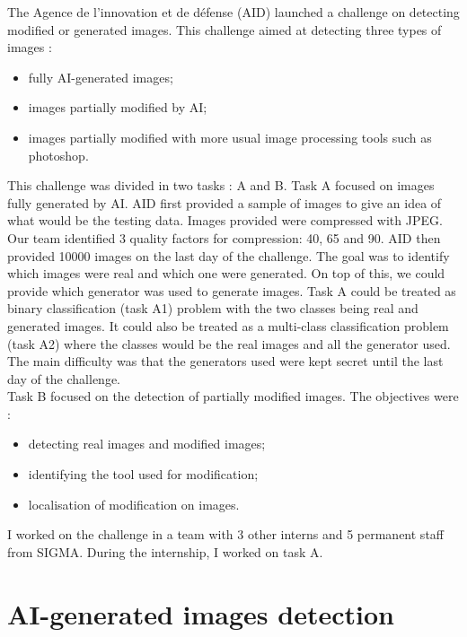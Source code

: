 \documentclass[12pt,a4paper]{article}
\begin{document}
The Agence de l'innovation et de défense (AID) launched a challenge on detecting modified or generated images. This challenge aimed at detecting three types of images :
\begin{itemize}
    \item fully AI-generated images;
    \item images partially modified by AI;
    \item images partially modified with more usual image processing tools such as photoshop.
\end{itemize}
This challenge was divided in two tasks : A and B. Task A focused on images fully generated by AI. AID first provided a sample of images to give an idea of what would be the testing data. Images provided were compressed with JPEG. Our team identified 3 quality factors for compression: 40, 65 and 90. AID then provided 10000 images on the last day of the challenge. The goal was to identify which images were real and which one were generated. On top of this, we could provide which generator was used to generate images. Task A could be treated as binary classification (task A1) problem with the two classes being real and generated images. It could also be treated as a multi-class classification problem (task A2) where the classes would be the real images and all the generator used. The main difficulty was that the generators used were kept secret until the last day of the challenge.\\
Task B focused on the detection of partially modified images. The objectives were :
\begin{itemize}
    \item detecting real images and modified images;
    \item identifying the tool used for modification;
    \item localisation of modification on images.
\end{itemize}

I worked on the challenge in a team with 3 other interns and 5 permanent staff from SIGMA. During the internship, I worked on task A.


\section{AI-generated images detection}
\end{document}
